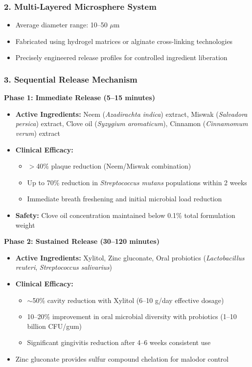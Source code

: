 \documentclass[12pt]{article}
\begin{document}
\subsubsection*{2. Multi-Layered Microsphere System}
\begin{itemize}
    \item Average diameter range: 10--50 $\mu$m
    \item Fabricated using hydrogel matrices or alginate cross-linking technologies
    \item Precisely engineered release profiles for controlled ingredient liberation
\end{itemize}

\subsubsection*{3. Sequential Release Mechanism}

\textbf{Phase 1: Immediate Release (5--15 minutes)}
\begin{itemize}
    \item \textbf{Active Ingredients:} Neem (\textit{Azadirachta indica}) extract, Miswak (\textit{Salvadora persica}) extract, Clove oil (\textit{Syzygium aromaticum}), Cinnamon (\textit{Cinnamomum verum}) extract
    \item \textbf{Clinical Efficacy:} 
        \begin{itemize}
            \item $>$40\% plaque reduction (Neem/Miswak combination)
            \item Up to 70\% reduction in \textit{Streptococcus mutans} populations within 2 weeks
            \item Immediate breath freshening and initial microbial load reduction
        \end{itemize}
    \item \textbf{Safety:} Clove oil concentration maintained below 0.1\% total formulation weight
\end{itemize}

\textbf{Phase 2: Sustained Release (30--120 minutes)}
\begin{itemize}
    \item \textbf{Active Ingredients:} Xylitol, Zinc gluconate, Oral probiotics (\textit{Lactobacillus reuteri}, \textit{Streptococcus salivarius})
    \item \textbf{Clinical Efficacy:}
        \begin{itemize}
            \item $\sim$50\% cavity reduction with Xylitol (6--10 g/day effective dosage)
            \item 10--20\% improvement in oral microbial diversity with probiotics (1--10 billion CFU/gum)
            \item Significant gingivitis reduction after 4--6 weeks consistent use 
        \end{itemize}
    \item Zinc gluconate provides sulfur compound chelation for malodor control
\end{itemize}
\end{document}
